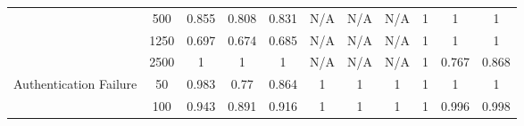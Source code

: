 \begin{table*}[]
{\begin{tabular}{ccccccccccc}
			\multicolumn{1}{|c|}{}                                            & \multicolumn{1}{c|}{500}           & \multicolumn{1}{c|}{0.855}                   & \multicolumn{1}{c|}{0.808}                & \multicolumn{1}{c|}{0.831}            & \multicolumn{1}{c|}{N/A}                      & \multicolumn{1}{c|}{N/A}                   & \multicolumn{1}{c|}{N/A}               & \multicolumn{1}{c|}{1}                      & \multicolumn{1}{c|}{1}                   & \multicolumn{1}{c|}{1}               \\ \cline{2-11}
			\multicolumn{1}{|c|}{}                                            & \multicolumn{1}{c|}{1250}          & \multicolumn{1}{c|}{0.697}                   & \multicolumn{1}{c|}{0.674}                & \multicolumn{1}{c|}{0.685}            & \multicolumn{1}{c|}{N/A}                        & \multicolumn{1}{c|}{N/A}                     & \multicolumn{1}{c|}{N/A}                 & \multicolumn{1}{c|}{1}                      & \multicolumn{1}{c|}{1}                   & \multicolumn{1}{c|}{1}               \\ \cline{2-11}
			\multicolumn{1}{|c|}{}                                            & \multicolumn{1}{c|}{2500}          & \multicolumn{1}{c|}{1}                       & \multicolumn{1}{c|}{1}                    & \multicolumn{1}{c|}{1}                & \multicolumn{1}{c|}{N/A}                        & \multicolumn{1}{c|}{N/A}                     & \multicolumn{1}{c|}{N/A}                 & \multicolumn{1}{c|}{1}                      & \multicolumn{1}{c|}{0.767}               & \multicolumn{1}{c|}{0.868}           \\ \hline
			\multicolumn{1}{|c|}{\multirow{6}{*}{Authentication Failure}}     & \multicolumn{1}{c|}{50}            & \multicolumn{1}{c|}{0.983}                   & \multicolumn{1}{c|}{0.77}                 & \multicolumn{1}{c|}{0.864}            & \multicolumn{1}{c|}{1}                        & \multicolumn{1}{c|}{1}                     & \multicolumn{1}{c|}{1}                 & \multicolumn{1}{c|}{1}                      & \multicolumn{1}{c|}{1}                   & \multicolumn{1}{c|}{1}               \\ \cline{2-11}
			\multicolumn{1}{|c|}{}                                            & \multicolumn{1}{c|}{100}           & \multicolumn{1}{c|}{0.943}                   & \multicolumn{1}{c|}{0.891}                & \multicolumn{1}{c|}{0.916}            & \multicolumn{1}{c|}{1}                        & \multicolumn{1}{c|}{1}                     & \multicolumn{1}{c|}{1}                 & \multicolumn{1}{c|}{1}                      & \multicolumn{1}{c|}{0.996}               & \multicolumn{1}{c|}{0.998}           \\ \cline{2-11}

\end{tabular}}
\end{table*}
